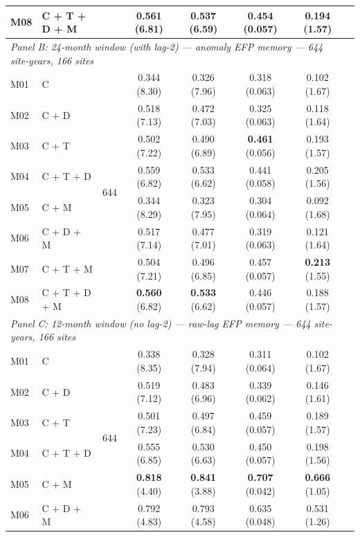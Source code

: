 \begin{table}[htbp]
\begin{tabular}{llcccccc}
M08 & C + T + D + M     &                      & \textbf{0.561} (6.81) & \textbf{0.537} (6.59) & 0.454 (0.057) & \textbf{0.194} (1.57) \\
\midrule
\multicolumn{7}{l}{\textit{Panel B: 24-month window (with lag-2) --- anomaly EFP memory --- 644 site-years, 166 sites}} \\
\midrule
M01 & C                 & \multirow{8}{*}{644} & 0.344 (8.30) & 0.326 (7.96) & 0.318 (0.063) & 0.102 (1.67) \\
M02 & C + D             &                      & 0.518 (7.13) & 0.472 (7.03) & 0.325 (0.063) & 0.118 (1.64) \\
M03 & C + T             &                      & 0.502 (7.22) & 0.490 (6.89) & \textbf{0.461} (0.056) & 0.193 (1.57) \\
M04 & C + T + D         &                      & 0.559 (6.82) & 0.533 (6.62) & 0.441 (0.058) & 0.205 (1.56) \\
M05 & C + M             &                      & 0.344 (8.29) & 0.323 (7.95) & 0.304 (0.064) & 0.092 (1.68) \\
M06 & C + D + M         &                      & 0.517 (7.14) & 0.477 (7.01) & 0.319 (0.063) & 0.121 (1.64) \\
M07 & C + T + M         &                      & 0.504 (7.21) & 0.496 (6.85) & 0.457 (0.057) & \textbf{0.213} (1.55) \\
M08 & C + T + D + M     &                      & \textbf{0.560} (6.82) & \textbf{0.533} (6.62) & 0.446 (0.057) & 0.188 (1.57) \\
\midrule
\multicolumn{7}{l}{\textit{Panel C: 12-month window (no lag-2) --- raw-lag EFP memory --- 644 site-years, 166 sites}} \\
\midrule
M01 & C                 & \multirow{8}{*}{644} & 0.338 (8.35) & 0.328 (7.94) & 0.311 (0.064) & 0.102 (1.67) \\
M02 & C + D             &                      & 0.519 (7.12) & 0.483 (6.96) & 0.339 (0.062) & 0.146 (1.61) \\
M03 & C + T             &                      & 0.501 (7.23) & 0.497 (6.84) & 0.459 (0.057) & 0.189 (1.57) \\
M04 & C + T + D         &                      & 0.555 (6.85) & 0.530 (6.63) & 0.450 (0.057) & 0.198 (1.56) \\
M05 & C + M             &                      & \textbf{0.818} (4.40) & \textbf{0.841} (3.88) & \textbf{0.707} (0.042) & \textbf{0.666} (1.05) \\
M06 & C + D + M         &                      & 0.792 (4.83) & 0.793 (4.58) & 0.635 (0.048) & 0.531 (1.26) \\

\end{tabular}
\end{table}

